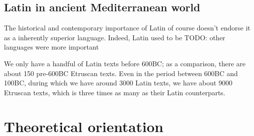 \documentclass[a4paper, oneside, 12pt]{report}
\begin{document}
\subsection{Latin in ancient Mediterranean world}

The historical and contemporary importance of Latin 
of course doesn't endorse it as a inherently superior language. 
Indeed, Latin used to be TODO: other languages were more important

We only have a handful of Latin texts before 600BC; 
as a comparison, there are about 150 pre-600BC Etruscan texts.
Even in the period between 600BC and 100BC, 
during which we have around 3000 Latin texts,
we have about 9000 Etruscan texts, 
which is three times as many as their Latin counterparts. 


\section{Theoretical orientation}\label{sec:theoretical-orientation}
\end{document}
